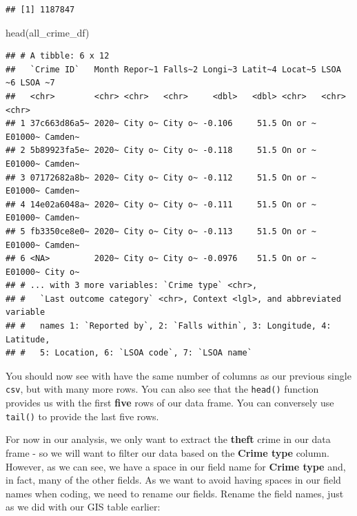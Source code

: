 \documentclass[
]{book}
\newenvironment{Shaded}{\begin{snugshade}}{\end{snugshade}}
\newcommand{\FunctionTok}[1]{\textcolor[rgb]{0.00,0.00,0.00}{#1}}
\newcommand{\NormalTok}[1]{#1}
\begin{document}
\begin{verbatim}
## [1] 1187847
\end{verbatim}

\begin{Shaded}
\begin{Highlighting}[]
\FunctionTok{head}\NormalTok{(all\_crime\_df)}
\end{Highlighting}
\end{Shaded}

\begin{verbatim}
## # A tibble: 6 x 12
##   `Crime ID`   Month Repor~1 Falls~2 Longi~3 Latit~4 Locat~5 LSOA ~6 LSOA ~7
##   <chr>        <chr> <chr>   <chr>     <dbl>   <dbl> <chr>   <chr>   <chr>  
## 1 37c663d86a5~ 2020~ City o~ City o~ -0.106     51.5 On or ~ E01000~ Camden~
## 2 5b89923fa5e~ 2020~ City o~ City o~ -0.118     51.5 On or ~ E01000~ Camden~
## 3 07172682a8b~ 2020~ City o~ City o~ -0.112     51.5 On or ~ E01000~ Camden~
## 4 14e02a6048a~ 2020~ City o~ City o~ -0.111     51.5 On or ~ E01000~ Camden~
## 5 fb3350ce8e0~ 2020~ City o~ City o~ -0.113     51.5 On or ~ E01000~ Camden~
## 6 <NA>         2020~ City o~ City o~ -0.0976    51.5 On or ~ E01000~ City o~
## # ... with 3 more variables: `Crime type` <chr>,
## #   `Last outcome category` <chr>, Context <lgl>, and abbreviated variable
## #   names 1: `Reported by`, 2: `Falls within`, 3: Longitude, 4: Latitude,
## #   5: Location, 6: `LSOA code`, 7: `LSOA name`
\end{verbatim}

You should now see with have the same number of columns as our previous single \texttt{csv}, but with many more rows. You can also see that the \texttt{head()} function provides us with the first \textbf{five} rows of our data frame. You can conversely use \texttt{tail()} to provide the last five rows.

For now in our analysis, we only want to extract the \textbf{theft} crime in our data frame - so we will want to filter our data based on the \textbf{Crime type} column. However, as we can see, we have a space in our field name for \textbf{Crime type} and, in fact, many of the other fields. As we want to avoid having spaces in our field names when coding, we need to rename our fields. Rename the field names, just as we did with our GIS table earlier:
\end{document}
